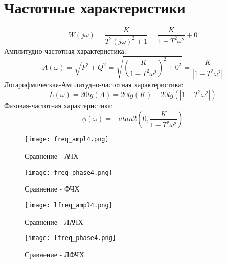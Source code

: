 \section{Частотные характеристики}
$$
W(j\omega) =  \frac{K}{T^2(j\omega)^2 + 1} = \frac{K}{1  - T^2\omega^2} + 0
$$
Амплитудно-частотная характеристика:
$$
A(\omega) = \sqrt{P^2 + Q^2} = \sqrt{(\frac{K}{1  - T^2\omega^2})^2 + 0^2} =  \frac{K}{|1  - T^2\omega^2|}
$$
Логарифмическая-Амплитудно-частотная характеристика:
$$
L(\omega) = 20lg(A) = 20lg(K) - 20lg(|1  - T^2\omega^2|)
$$
Фазовая-частотная характеристика:
$$
\phi(\omega) = -atan2(0, \frac{K}{1  - T^2\omega^2})
$$
\newpage
\begin{figure}[ht]
  \centering
  \texttt{[image: freq\_ampl4.png]}
\caption{Сравнение - АЧХ}
\end{figure}

\begin{figure}[ht]
    \centering
    \texttt{[image: freq\_phase4.png]}
  \caption{Сравнение - ФЧХ}
  \end{figure}
\newpage
\begin{figure}[ht]
    \centering
    \texttt{[image: lfreq\_ampl4.png]}
  \caption{Сравнение - ЛАЧХ}
  \end{figure}
  
  \begin{figure}[ht]
      \centering
      \texttt{[image: lfreq\_phase4.png]}
    \caption{Сравнение - ЛФЧХ}
    \end{figure}

\newpage

\endinput